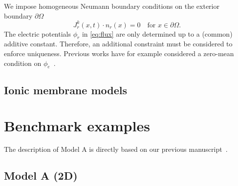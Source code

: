 \documentclass[fleqn,10pt]{wlscirep}
\begin{document}
We impose homogeneous Neumann boundary conditions on the exterior boundary $\partial \Omega$
\begin{equation}\label{eq::bc}
  J_r^k(x,t) \cdot n_r(x) = 0 \quad \text{for } x \in \partial\Omega.
\end{equation}
The electric potentials $\phi_r$ in \eqref{eq:flux} are only determined up to a (common) additive constant. Therefore, an additional constraint must be considered to enforce uniqueness. Previous works have for example considered a zero-mean condition on $\phi_e$~\cite{ellingsrud2020finite}. 

\subsection{Ionic membrane models}
\label{sec::ion}


\newpage
\section{Benchmark examples}

The description of Model A is directly based on our previous manuscript~\cite{benedusi2024scalable}.

\subsection{Model A (2D)}
\end{document}
